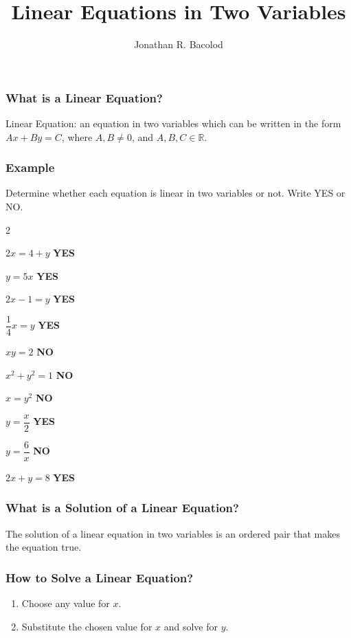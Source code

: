 \documentclass[14pt]{beamer}
\title[] {Linear Equations in Two Variables}
\author{Jonathan R. Bacolod}
\institute[SHS]{Sauyo High School}
\date{}
\begin{document}
	\frame{\titlepage}
	
	\begin{frame}
		\frametitle{What is a Linear Equation?}
		Linear Equation: an equation in two variables which can be written in the form $ Ax+By=C $, where $ A, B \neq 0$, and $ A, B, C \in \mathbb{R} $. 
	\end{frame}

    \begin{frame}
    	\frametitle{Example}
    	Determine whether each equation is linear in two variables or not. Write YES or NO.
    	\begin{enumerate}
    	\end{enumerate}
     \end{frame}
 
    \begin{frame}
    	\frametitle{What is a Solution of a Linear Equation?}
    	The solution of a linear equation in two variables is an ordered pair that makes the
equation true.
    \end{frame}

\begin{frame}
	\frametitle{How to Solve a Linear Equation?}
	\begin{enumerate}
		\item Choose any value for $ x $.
		\item \pause Substitute the chosen value for $ x $ and solve for $ y $.
	\end{enumerate}
\end{frame}
\end{document}
